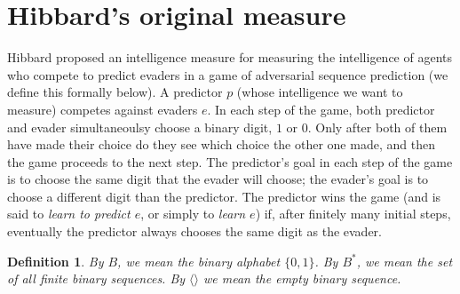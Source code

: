 \documentclass{article}
\newtheorem{definition}[theorem]{Definition}
\begin{document}
\section{Hibbard's original measure}
\label{originalmeasuresection}

Hibbard proposed an intelligence measure for measuring the intelligence
of agents who compete to predict evaders in a game of
adversarial sequence prediction (we define this
formally below). A predictor $p$ (whose intelligence we want to measure)
competes against evaders $e$. In each step of the game,
both predictor and evader simultaneoulsy choose a binary digit, $1$ or $0$.
Only after both of them have made their choice do they see which choice the other
one made, and then the game proceeds to the next step. The predictor's goal in
each step of the game is to choose the same digit that the evader will choose;
the evader's goal is to choose a different digit than the predictor. The predictor
wins the game (and is said to \emph{learn to predict $e$}, or simply to
\emph{learn $e$}) if, after finitely many
initial steps, eventually the predictor always chooses the same digit as the
evader.

\begin{definition}
By $B$, we mean the binary alphabet $\{0,1\}$. By $B^*$, we mean the set of all
finite binary sequences. By $\langle\rangle$ we mean the empty binary sequence.
\end{definition}
\end{document}
